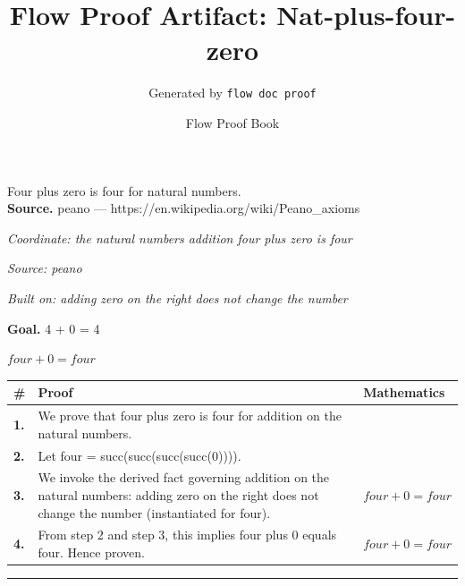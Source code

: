 \documentclass[11pt]{article}
\title{Flow Proof Artifact: Nat-plus-four-zero}
\author{Generated by \texttt{flow doc proof}}
\date{Flow Proof Book}
\theoremstyle{definition}
\begin{document}
\maketitle
Four plus zero is four for natural numbers.\\[0.5em]
\textbf{Source.} peano — https://en.wikipedia.org/wiki/Peano\_axioms\\[0.5em]
\bigskip
{}\par
\smallskip\noindent\textit{Coordinate: the natural numbers \cdot addition \cdot four plus zero is four}\par
\smallskip\noindent\textit{Source: peano}\par
\smallskip\noindent\textit{Built on: adding zero on the right does not change the number}\par
\medskip
\noindent\textbf{Goal.} 4 + 0 = 4\par
\noindent$\displaystyle four + 0 = four$\par
\medskip
\noindent
\begin{tabular}{@{} >{\raggedright\arraybackslash}p{} >{\raggedright\arraybackslash}p{} >{\raggedleft\arraybackslash}p{} @{}}
\textbf{\#} & \textbf{Proof} & \textbf{Mathematics} \\
\midrule
\textbf{1.} & We prove that four plus zero is four for addition on the natural numbers. & \\[0.45em]
\textbf{2.} & Let four = succ(succ(succ(succ(0)))). & \\[0.45em]
\textbf{3.} & We invoke the derived fact governing addition on the natural numbers: adding zero on the right does not change the number (instantiated for four). & $\displaystyle four + 0 = four$ \\[0.45em]
\textbf{4.} & From step 2 and step 3, this implies four plus 0 equals four. Hence proven. & $\displaystyle four + 0 = four$ \\[0.45em]
\bottomrule
\end{tabular}
\label{thm:Nat-addition-four_plus_zero_is_four}
\par\medskip\hrule
\end{document}
